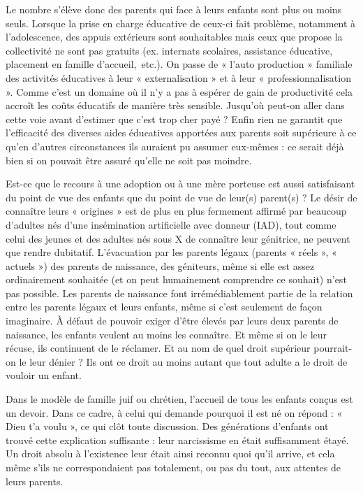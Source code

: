  Le nombre s'élève donc des parents qui face à leurs enfants sont plus ou moins seuls. Lorsque la prise en charge éducative de ceux-ci fait problème, notamment à l'adolescence, des appuis extérieurs sont souhaitables mais ceux que propose la collectivité ne sont pas gratuits (ex. internats scolaires, assistance éducative, placement en famille d'accueil,~etc.). On passe de « l'auto production » familiale des activités éducatives à leur « externalisation » et à leur « professionnalisation ». Comme c'est un domaine où il n'y a pas à espérer de gain de productivité cela accroît les coûts éducatifs de manière très sensible. Jusqu'où peut-on aller dans cette voie avant d'estimer que c'est trop cher payé ? Enfin rien ne garantit que l'efficacité des diverses aides éducatives apportées aux parents soit supérieure à ce qu'en d'autres circonstances ils auraient pu assumer eux-mêmes : ce serait déjà bien si on pouvait être assuré qu'elle ne soit pas moindre. 
 
 Est-ce que le recours à une adoption ou à une mère porteuse est aussi satisfaisant du point de vue des enfants que du point de vue de leur(s) parent(s) ? Le désir de connaître leurs « origines » est de plus en plus fermement affirmé par beaucoup d'adultes nés d'une insémination artificielle avec donneur (IAD), tout comme celui des jeunes et des adultes nés sous X de connaître leur génitrice, ne peuvent que rendre dubitatif. L'évacuation par les parents légaux (parents « réels », « actuels ») des parents de naissance, des géniteurs, même si elle est assez ordinairement souhaitée (et on peut humainement comprendre ce souhait) n'est pas possible. Les parents de naissance font irrémédiablement partie de la relation entre les parents légaux et leurs enfants, même si c'est seulement de façon imaginaire. À défaut de pouvoir exiger d'être élevés par leurs deux parents de naissance, les enfants veulent au moins les connaître. Et même si on le leur récuse, ils continuent de le réclamer. Et au nom de quel droit supérieur pourrait-on le leur dénier ? Ils ont ce droit au moins autant que tout adulte a le droit de vouloir un enfant. 
 
 Dans le modèle de famille juif ou chrétien, l'accueil de tous les enfants conçus est un devoir. Dans ce cadre, à celui qui demande pourquoi il est né on répond : « Dieu t'a voulu », ce qui clôt toute discussion. Des générations d'enfants ont trouvé cette explication suffisante : leur narcissisme en était suffisamment étayé. Un droit absolu à l'existence leur était ainsi reconnu quoi qu'il arrive, et cela même s'ils ne correspondaient pas totalement, ou pas du tout, aux attentes de leurs parents.
  
